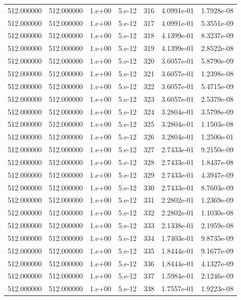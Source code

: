 \begin{table}[htbp]
\begin{tabular}{rrrrrrr}
512.000000 & 512.000000 & 1.e+00 & 5.e-12 & 316 & 4.0991e-01 & 1.7928e-08 \\
512.000000 & 512.000000 & 1.e+00 & 5.e-12 & 317 & 4.0991e-01 & 5.3551e-09 \\
512.000000 & 512.000000 & 1.e+00 & 5.e-12 & 318 & 4.1399e-01 & 8.3237e-09 \\
512.000000 & 512.000000 & 1.e+00 & 5.e-12 & 319 & 4.1399e-01 & 2.8522e-08 \\
512.000000 & 512.000000 & 1.e+00 & 5.e-12 & 320 & 3.6057e-01 & 5.8790e-09 \\
512.000000 & 512.000000 & 1.e+00 & 5.e-12 & 321 & 3.6057e-01 & 1.2398e-08 \\
512.000000 & 512.000000 & 1.e+00 & 5.e-12 & 322 & 3.6057e-01 & 5.4715e-09 \\
512.000000 & 512.000000 & 1.e+00 & 5.e-12 & 323 & 3.6057e-01 & 2.5379e-08 \\
512.000000 & 512.000000 & 1.e+00 & 5.e-12 & 324 & 3.2804e-01 & 3.5798e-09 \\
512.000000 & 512.000000 & 1.e+00 & 5.e-12 & 325 & 3.2804e-01 & 1.1503e-08 \\
512.000000 & 512.000000 & 1.e+00 & 5.e-12 & 326 & 3.2804e-01 & 1.2500e-01 \\
512.000000 & 512.000000 & 1.e+00 & 5.e-12 & 327 & 2.7433e-01 & 9.2150e-09 \\
512.000000 & 512.000000 & 1.e+00 & 5.e-12 & 328 & 2.7433e-01 & 1.8437e-08 \\
512.000000 & 512.000000 & 1.e+00 & 5.e-12 & 329 & 2.7433e-01 & 4.3947e-09 \\
512.000000 & 512.000000 & 1.e+00 & 5.e-12 & 330 & 2.7433e-01 & 8.7603e-09 \\
512.000000 & 512.000000 & 1.e+00 & 5.e-12 & 331 & 2.2802e-01 & 1.2369e-09 \\
512.000000 & 512.000000 & 1.e+00 & 5.e-12 & 332 & 2.2802e-01 & 1.1030e-08 \\
512.000000 & 512.000000 & 1.e+00 & 5.e-12 & 333 & 2.1338e-01 & 2.1959e-08 \\
512.000000 & 512.000000 & 1.e+00 & 5.e-12 & 334 & 1.7403e-01 & 9.8735e-09 \\
512.000000 & 512.000000 & 1.e+00 & 5.e-12 & 335 & 1.8444e-01 & 9.1677e-09 \\
512.000000 & 512.000000 & 1.e+00 & 5.e-12 & 336 & 1.8444e-01 & 4.1327e-09 \\
512.000000 & 512.000000 & 1.e+00 & 5.e-12 & 337 & 1.5984e-01 & 2.1246e-09 \\
512.000000 & 512.000000 & 1.e+00 & 5.e-12 & 338 & 1.7557e-01 & 1.9223e-08 \\

\end{tabular}
\end{table}

